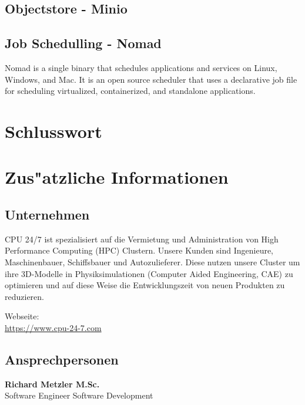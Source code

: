 \documentclass[12pt]{article}
\begin{document}
\subsection{Objectstore - Minio}
\subsection{Job Schedulling - Nomad}
Nomad is a single binary that schedules applications and services on Linux, Windows, and Mac. It is an open source scheduler that uses a declarative job file for scheduling virtualized, containerized, and standalone applications.


\newpage


\section{Schlusswort}
\newpage

\section{Zus"atzliche Informationen}
\subsection{Unternehmen}

CPU 24/7 ist spezialisiert auf die Vermietung und Administration
von High Performance Computing (HPC) Clustern.
Unsere Kunden sind Ingenieure, Maschinenbauer, Schiffsbauer und Autozulieferer.
Diese nutzen unsere Cluster um ihre 3D-Modelle in Physiksimulationen (Computer Aided Engineering, CAE)
zu optimieren und auf diese Weise die Entwicklungszeit von neuen Produkten zu reduzieren.

Webseite:\\
\url{https://www.cpu-24-7.com}



\subsection{Ansprechpersonen}

\textbf{Richard Metzler M.Sc.}\\
Software Engineer Software Development
\end{document}
